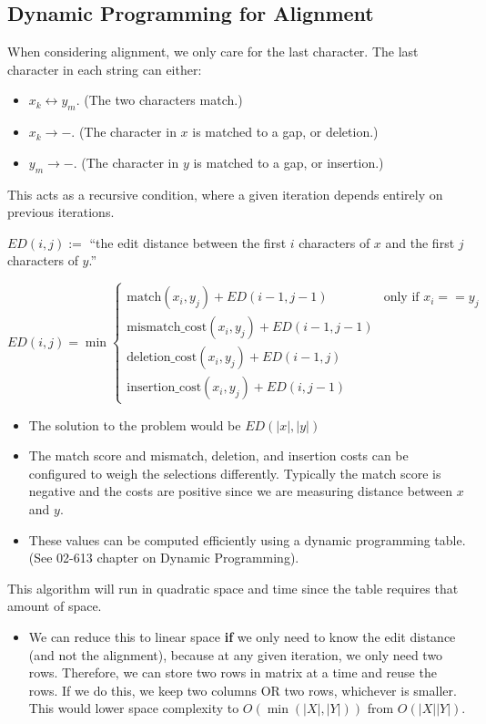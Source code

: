 \documentclass[10pt]{article}
\begin{document}
\subsection*{Dynamic Programming for Alignment}
When considering alignment, we only care for the last character.  The last character in each string can either:
\begin{itemize}
	\item $x_k \leftrightarrow y_m$.  (The two characters match.)
	\item $x_k \rightarrow -$.  (The character in $x$ is matched to a gap, or deletion.)
	\item $y_m \rightarrow -$.  (The character in $y$ is matched to a gap, or insertion.)
\end{itemize}
This acts as a recursive condition, where a given iteration depends entirely on previous iterations.
\begin{center}
$ED(i, j) :=$ ``the edit distance between the first $i$ characters of $x$ and the first $j$ characters of $y$.''
\end{center}
\[ED(i, j) = \min \begin{cases}
\text{match}(x_i, y_j) + ED(i - 1, j - 1) & \text{only if $x_i == y_j$} \\
\text{mismatch\_cost}(x_i, y_j) + ED(i - 1, j - 1) \\
\text{deletion\_cost}(x_i, y_j) + ED(i - 1, j) \\
\text{insertion\_cost}(x_i, y_j) + ED(i, j - 1)
\end{cases}\]
\begin{itemize}
	\item The solution to the problem would be $ED(|x|, |y|)$
	\item The match score and mismatch, deletion, and insertion costs can be configured to weigh the selections differently.  Typically the match score is negative and the costs are positive since we are measuring distance between $x$ and $y$.
	\item These values can be computed efficiently using a dynamic programming table.  (See 02-613 chapter on Dynamic Programming).
\end{itemize}
This algorithm will run in quadratic space and time since the table requires that amount of space.
\begin{itemize}
	\item We can reduce this to linear space \textbf{if} we only need to know the edit distance (and not the alignment), because at any given iteration, we only need two rows.  Therefore, we can store two rows in matrix at a time and reuse the rows.  If we do this, we keep two columns OR two rows, whichever is smaller.  This would lower space complexity to $O(\min(|X|, |Y|))$ from $O(|X| |Y|)$.
\end{itemize}
\end{document}
